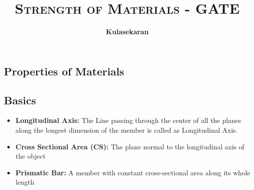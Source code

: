 \documentclass[8pt]{report}
\title{\Huge{\textsc{Strength of Materials - GATE}}}
\author{\huge{\textbf{Kulasekaran}}}
\begin{document}
\maketitle
\tableofcontents
\begin{center}
	\chapter{Properties of Materials}
	\centering
\end{center}
\section{Basics}
	\begin{itemize}
		\item \textbf{Longitudinal Axis: }The Line passing through the center of all the planes along the longest dimension of the member is called as Longitudinal Axis. 
		\item \textbf{Cross Sectional Area (CS): }The plane normal to the longitudinal axis of the object
		\item \textbf{Prismatic Bar: }A member with constant cross-sectional area along its whole length
	\end{itemize}\hrulefill
\end{document}
